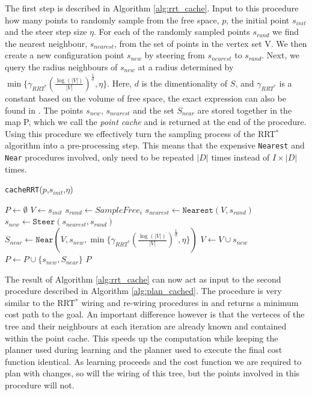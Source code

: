 \documentclass{article}  %
\begin{document}
	The first step is described in Algorithm \ref{alg:rrt_cache}. Input to this procedure how many points to randomly sample from the free space, $p$, the initial point $s_{init}$ and the steer step size $\eta$. For each of the randomly sampled points $s_{rand}$ we find the nearest neighbour, $s_{nearest}$, from the set of points in the vertex set V. We then create a new configuration point $s_{new}$ by steering from $s_{nearest}$ to $s_{rand}$. Next, we query the radius neighbours of $s_{new}$ at a radius determined by  $\min\{\gamma_{RRT^*}(\frac{\log(|V|)}{|V|})^{\frac{1}{d}},\eta\}$. Here, $d$ is the dimentionality of $S$, and $\gamma_{RRT^*}$ is a constant based on the volume of free space, the exact expression can also be found in \cite{karaman2011sampling}. The points $s_{new}$, $s_{nearest}$ and the set $S_{near}$ are stored together in the map P, which we call the \emph{point cache} and is returned at the end of the procedure. Using this procedure we effectively turn the sampling process of the RRT$^*$ algorithm into a pre-processing step. This means that the expensive \texttt{Nearest} and \texttt{Near} procedures involved, only need to be repeated $|D|$ times instead of $I\times|D|$ times.




	\begin{algorithm}
	\caption{\texttt{cacheRRT}($p$,$s_{init}$,$\eta$)}
	\label{alg:rrt_cache}
	\begin{algorithmic}[1]
	\STATE $P \gets \emptyset$ \hfill {}
	\STATE $V \gets {s_{init}}$
	\STATE $s_{rand} \gets SampleFree_i$
	\STATE $s_{nearest} \gets \texttt{Nearest}(V,s_{rand})$
	\STATE $s_{new} \gets \texttt{Steer}(s_{nearest},s_{rand})$
	\STATE $S_{near} \gets \texttt{Near}(V,{s_{new}},\min\{\gamma_{RRT^*}(\frac{\log(|V|)}{|V|})^{\frac{1}{d}},\eta\})$ 
	\STATE $V\gets V \cup s_{new}$
	\STATE $P \gets P \cup \{s_{new},S_{near}\}$
	\ENDFOR
	\RETURN $P$

	\end{algorithmic}
	\end{algorithm}

	The result of Algorithm \ref{alg:rrt_cache} can now act as input to the second procedure described in Algorithm \ref{alg:plan_cached}. The procedure is very similar to the RRT$^*$ wiring and re-wiring procedures in \cite{karaman2011sampling} and returns a minimum cost path to the goal. An important difference however is that the verteces of the tree and their neighbours at each iteration are already known and contained within the point cache. This speeds up the computation while keeping the planner used during learning and the planner used to execute the final cost function identical. As learning proceeds and the cost function we are required to plan with changes, so will the wiring of this tree, but the points involved in this procedure will not. 
\end{document}
